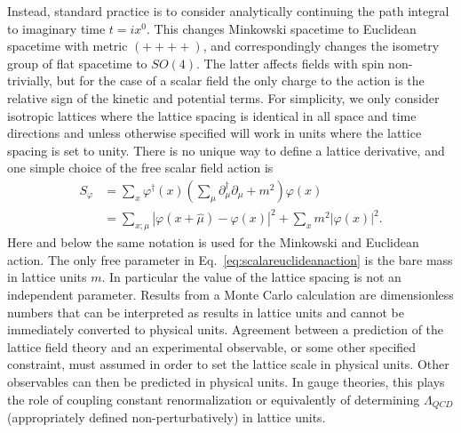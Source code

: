 Instead, standard practice is to consider analytically continuing the path integral to imaginary time $t = i x^0$.
This changes Minkowski spacetime to Euclidean spacetime with metric $(++++)$, and correspondingly changes the isometry group of flat spacetime to $SO(4)$.
The latter affects fields with spin non-trivially, but for the case of a scalar field the only charge to the action is the relative sign of the kinetic and potential terms.
For simplicity, we only consider isotropic lattices where the lattice spacing is identical in all space and time directions and unless otherwise specified will work in units where the lattice spacing is set to unity.
There is no unique way to define a lattice derivative, and one simple choice of the free scalar field action is
\begin{equation}
  \begin{split}
  S_\varphi &= \sum_{x} \varphi^\dagger(x) \left( \sum_\mu \partial_\mu^\dagger\partial_\mu + m^2 \right)\varphi(x)\\
  &= \sum_{x;\mu} |\varphi(x+\hat{\mu}) -  \varphi(x)|^2 + \sum_x m^2|\varphi(x)|^2.
  \label{eq:scalareuclideanaction}
\end{split}
\end{equation}
Here and below the same notation is used for the Minkowski and Euclidean action.
The only free parameter in Eq.~\eqref{eq:scalareuclideanaction} is the bare mass in lattice units $m$.
In particular the value of the lattice spacing is not an independent parameter.
Results from a Monte Carlo calculation are dimensionless numbers that can be interpreted as results in lattice units
and cannot be immediately converted to physical units.
Agreement between a prediction of the lattice field theory and an experimental observable, or some other specified constraint, must assumed in order to set the lattice scale in physical units.
Other observables can then be predicted in physical units.
In gauge theories, this plays the role of coupling constant renormalization or equivalently of determining $\Lambda_{QCD}$ (appropriately defined non-perturbatively) in lattice units.

